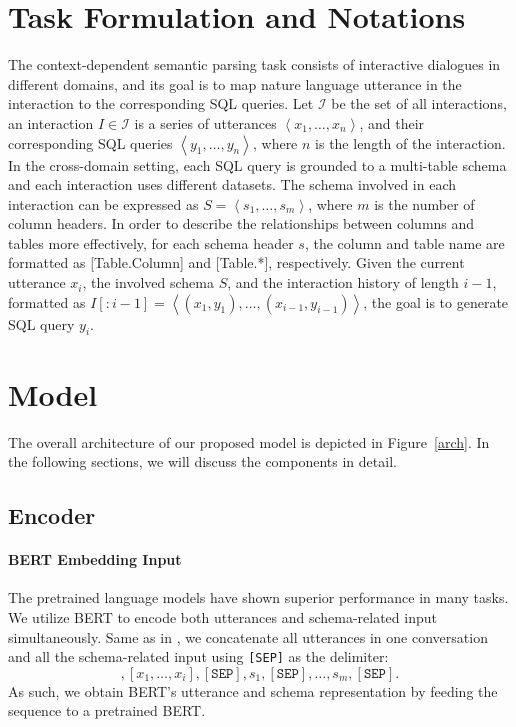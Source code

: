 \documentclass[letterpaper]{article} \usepackage{aaai21}  \usepackage{times}  \usepackage{helvet} \usepackage{courier}  \usepackage[hyphens]{url}  \usepackage{graphicx} \urlstyle{rm} \def\UrlFont{\rm}  \usepackage{natbib}  \usepackage{caption} \frenchspacing  \setlength{\pdfpagewidth}{8.5in}  \setlength{\pdfpageheight}{11in}
\begin{document}
\section{Task Formulation and Notations}
The context-dependent semantic parsing task consists of interactive dialogues in different domains, and its goal is to map nature language utterance in the interaction to the corresponding SQL queries.
Let $\mathcal{I}$ be the set of all interactions, an interaction $I \in \mathcal{I}$ is a series of utterances $\left\langle{x}_{1}, \ldots, {x}_{n}\right\rangle$, and their corresponding SQL queries $\left\langle{y}_{1}, \ldots, {y}_{n}\right\rangle$, where $n$ is the length of the interaction.
In the cross-domain setting, each SQL query is grounded to a multi-table schema and each interaction uses different datasets.
The schema involved in each interaction can be expressed as $S = \left\langle{s}_{1}, \ldots, {s}_{m}\right\rangle$, where $m$ is the number of column headers.
In order to describe the relationships between columns and tables more effectively, for each schema header $s$, the column and table name are formatted as [Table.Column] and [Table.*], respectively.
Given the current utterance $x_i$, the involved schema $S$, and the interaction history of length $i - 1$, formatted as $I[: i-1]=\left\langle\left({x}_{1}, {y}_{1}\right), \ldots,\left({x}_{i-1}, {y}_{i-1}\right)\right\rangle$, the goal is to generate SQL query $y_i$.

\section{Model}
The overall architecture of our proposed model is depicted in Figure~\ref{arch}. In the following sections, we will discuss the components in detail. 


\subsection{Encoder}
\label{encoder}
\paragraph{BERT Embedding Input}
The pretrained language models have shown superior performance in many tasks. We utilize BERT \cite{DBLP:conf/naacl/DevlinCLT19} to encode both utterances and schema-related input simultaneously.
Same as in \cite{Hwang2019ACE}, we concatenate all utterances in one conversation and all the schema-related input using \texttt{[SEP]} as the delimiter:
\begin{equation}
[\texttt{CLS}], [x_{1}, \ldots, x_{i}],[\texttt{SEP}], s_{1},[\texttt{SEP}], \ldots, s_{m},[\texttt{SEP}].
\label{input}
\end{equation}
As such, we obtain BERT's utterance and schema representation by feeding the sequence to a pretrained BERT.
\end{document}

